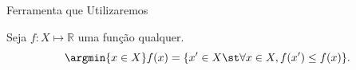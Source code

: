 
\begin{frame}{Ferramenta que Utilizaremos}

  \begin{definition}[Argmin]
    Seja $f : X \mapsto \mathbb{R}$ uma função qualquer.
    \[
      \argmin{x \in X} f(x) = \{x' \in X \st \forall x \in X, f(x') \leq f(x)\}.
    \]
  \end{definition}

\end{frame}